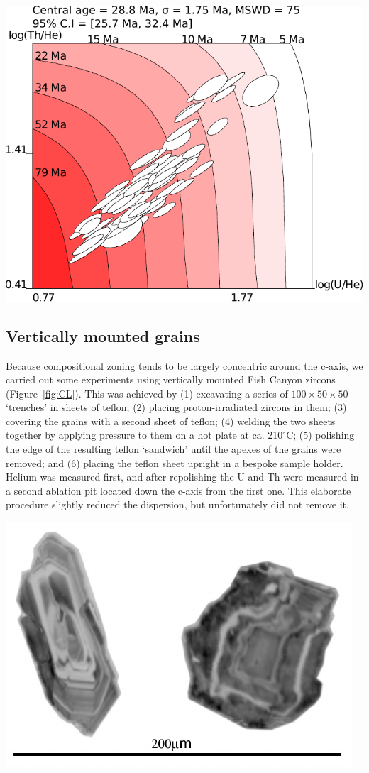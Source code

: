 \documentclass{article}
\begin{document}
\includegraphics[width=.5\textwidth]{FCZ.pdf} 
\label{fig:FCZ}

\subsection{Vertically mounted grains}\label{sec:vertical}

Because compositional zoning tends to be largely concentric around the
c-axis, we carried out some experiments using vertically mounted Fish
Canyon zircons (Figure~\ref{fig:CL}).  This was achieved by (1)
excavating a series of $100\times{50}\times{50}$~ `trenches'
in sheets of teflon; (2) placing proton-irradiated zircons in them;
(3) covering the grains with a second sheet of teflon; (4) welding the
two sheets together by applying pressure to them on a hot plate at
ca. 210$^\circ$C; (5) polishing the edge of the resulting teflon
`sandwich' until the apexes of the grains were removed; and (6)
placing the teflon sheet upright in a bespoke sample holder. Helium
was measured first, and after repolishing the U and Th were measured
in a second ablation pit located down the c-axis from the first
one. This elaborate procedure slightly reduced the dispersion, but
unfortunately did not remove it.\medskip

\includegraphics[width=.5\textwidth]{CL.pdf}
\label{fig:CL}
\end{document}
